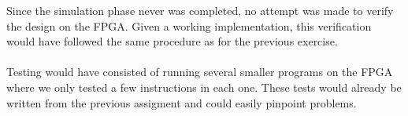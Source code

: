 Since the simulation phase never was completed, no attempt was made to verify
the design on the FPGA. Given a working implementation, this verification would
have followed the same procedure as for the previous exercise.
\paragraph*{}
Testing would have consisted of running several smaller programs on the FPGA
where we only tested a few instructions in each one. These tests would already
be written from the previous assigment and could easily pinpoint problems.
